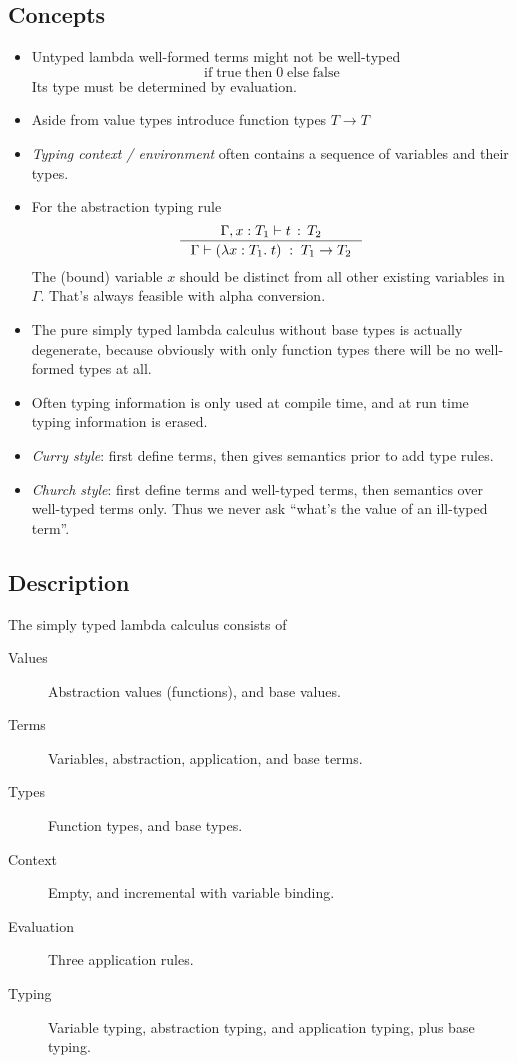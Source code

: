 \documentclass{article}
\newcommand{\ite}[3]{\text{if}\; #1 \; \text{then}\; #2 \; \text{else}\; #3}
\newcommand{\lamt}[3]{\lambda #1: #2 .\;#3}
\newcommand{\mtrue}{\mathrm{true}}
\newcommand{\mfalse}{\mathrm{false}}
\begin{document}
\subsection{Concepts}
  \begin{itemize}
    \item Untyped lambda well-formed terms might not be well-typed \[ \ite{\mtrue}{0}{\mfalse}\]
      Its type must be determined by evaluation.
    \item Aside from value types introduce function types $T \to T$
    \item \emph{Typing context / environment} often contains a sequence of variables and their types.
    \item For the abstraction typing rule \[
        \inference{\Gamma, x: T_1\vdash t\, :\, T_2}{\Gamma \vdash (\lamt{x}{T_1}{t}) \;:\; T_1 \to T_2}
      \] The (bound) variable $x$ should be distinct from all other existing variables in $\Gamma$.
      That's always feasible with alpha conversion.
    \item The pure simply typed lambda calculus without base types is actually degenerate,
      because obviously with only function types there will be no well-formed types at all.
    \item Often typing information is only used at compile time,
      and at run time typing information is erased.
    \item \emph{Curry style}: first define terms, then gives semantics prior to add type rules.
    \item \emph{Church style}: first define terms and well-typed terms, then semantics over well-typed terms only.
      Thus we never ask ``what's the value of an ill-typed term''.
  \end{itemize}

\subsection{Description}
  The simply typed lambda calculus consists of \begin{description}
    \item[Values] Abstraction values (functions), and base values.
    \item[Terms] Variables, abstraction, application, and base terms.
    \item[Types] Function types, and base types.
    \item[Context] Empty, and incremental with variable binding.
    \item[Evaluation] Three application rules.
    \item[Typing] Variable typing, abstraction typing, and application typing, plus base typing.
  \end{description}
\end{document}

